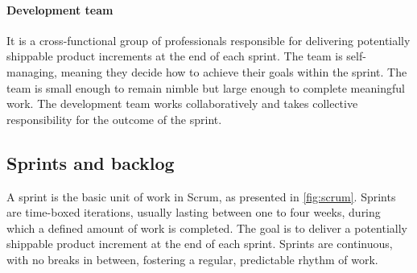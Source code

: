 \paragraph{Development team} It is a cross-functional group of professionals
    responsible for delivering potentially shippable product increments at the end of each
    sprint. The team is self-managing, meaning they decide how to achieve their goals
    within the sprint. The team is small enough to remain nimble but large enough
    to complete meaningful work. The development team works
    collaboratively and takes collective responsibility for the outcome of the sprint.

\subsection{Sprints and backlog}

A sprint is the basic unit of work in Scrum, as presented in \cref{fig:scrum}. Sprints
are time-boxed iterations, usually lasting between one to four weeks, during which a
defined amount of work is completed. The goal is to deliver a potentially shippable
product increment at the end of each sprint. Sprints are continuous, with no breaks in
between, fostering a regular, predictable rhythm of work\nocite{cobb2015scrum}.

